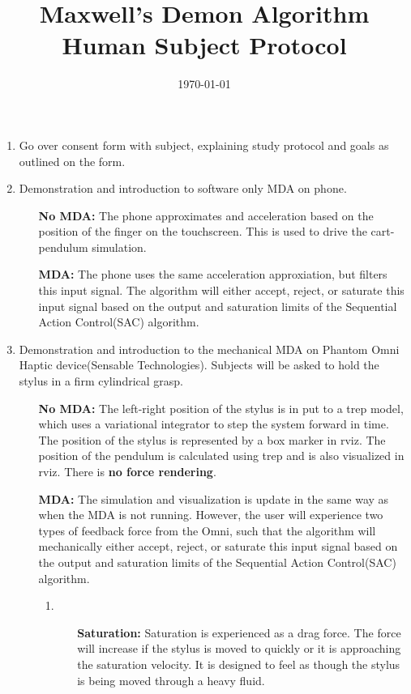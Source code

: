 \documentclass[11pt]{article}
\begin{document}
\title{Maxwell's Demon Algorithm Human Subject Protocol}
\author{}
\date{\today}
\maketitle


\begin{enumerate}
\item Go over consent form with subject, explaining study protocol and goals as outlined on the form.
\item Demonstration and introduction to software only MDA on phone.
	\begin{enumerate}
	\item[\textbf{No MDA:}] The phone approximates and acceleration based on the position of the finger on the touchscreen. This is used to drive the cart-pendulum simulation.
	\item[\textbf{MDA:}] The phone uses the same acceleration approxiation, but filters this input signal. The algorithm will either accept, reject, or saturate this input signal based on the output and saturation limits of the Sequential Action Control(SAC) algorithm. 
	\end{enumerate}
\item Demonstration and introduction to the mechanical MDA on Phantom Omni Haptic device(Sensable Technologies). Subjects will be asked to hold the stylus in a firm cylindrical grasp.
	\begin{enumerate}
	\item[\textbf{No MDA:}] The left-right position of the stylus is in put to a trep model, which uses a variational integrator to step the system forward in time. The position of the stylus is represented by a box marker in rviz. The position of the pendulum is calculated using trep and is also visualized in rviz. There is \textbf{no force rendering}.
	\item[\textbf{MDA:}] The simulation and visualization is update in the same way as when the MDA is not running. However, the user will experience two types of feedback force from the Omni, such that the algorithm will mechanically either accept, reject, or saturate this input signal based on the output and saturation limits of the Sequential Action Control(SAC) algorithm. 
		\begin{enumerate}
			\item \begin{enumerate}
			\item[\textbf{Saturation:}] Saturation is experienced as a drag force. The force will increase   if the stylus is moved to quickly or it is approaching the saturation velocity. It is designed to feel as though the stylus is being moved through a heavy fluid.

\end{enumerate}
\end{enumerate}
\end{enumerate}
\end{enumerate}
\end{document}
